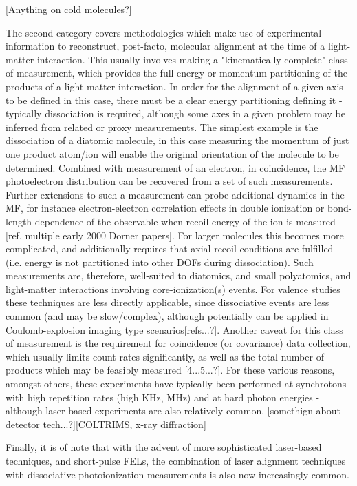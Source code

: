 [Anything on cold molecules?]

The second category covers methodologies which make use of experimental information to reconstruct, post-facto, molecular alignment at the time of a light-matter interaction. This usually involves making a "kinematically complete" class of measurement, which provides the full energy or momentum partitioning of the products of a light-matter interaction. In order for the alignment of a given axis to be defined in this case, there must be a clear energy partitioning defining it - typically dissociation is required, although some axes in a given problem may be inferred from related or proxy measurements. The simplest example is the dissociation of a diatomic molecule, in this case measuring the momentum of just one product atom/ion will enable the original orientation of the molecule to be determined. Combined with measurement of an electron, in coincidence, the MF photoelectron distribution can be recovered from a set of such measurements. Further extensions to such a measurement can probe additional dynamics in the MF, for instance electron-electron correlation effects in double ionization or bond-length dependence of the observable when recoil energy of the ion is measured [ref. multiple early 2000 Dorner papers]. For larger molecules this becomes more complicated, and additionally requires that axial-recoil conditions are fulfilled (i.e. energy is not partitioned into other DOFs during dissociation). Such measurements are, therefore, well-suited to diatomics, and small polyatomics, and light-matter interactions involving core-ionization(s) events. For valence studies these techniques are less directly applicable, since dissociative events are less common (and may be slow/complex), although potentially can be applied in Coulomb-explosion imaging type scenarios[refs...?]. Another caveat for this class of measurement is the requirement for coincidence (or covariance) data collection, which usually limits count rates significantly, as well as the total number of products which may be feasibly measured [4...5...?]. For these various reasons, amongst others, these experiments have typically been performed at synchrotons with high repetition rates (high KHz, MHz) and at hard photon energies - although laser-based experiments are also relatively common. [somethign about detector tech...?][COLTRIMS, x-ray diffraction] 

Finally, it is of note that with the advent of more sophisticated laser-based techniques, and short-pulse FELs, the combination of laser alignment techniques with dissociative photoionization measurements is also now increasingly common.

